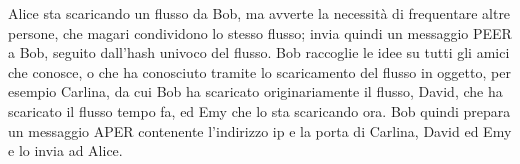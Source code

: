 Alice sta scaricando un flusso da Bob, ma avverte la necessità di frequentare
altre persone, che magari condividono lo stesso flusso; invia quindi un messaggio
PEER a Bob, seguito dall'hash univoco del flusso. Bob raccoglie le idee su tutti
gli amici che conosce, o che ha conosciuto tramite lo scaricamento del flusso in
oggetto, per esempio Carlina, da cui Bob ha scaricato originariamente il flusso,
David, che ha scaricato il flusso tempo fa, ed Emy che lo sta scaricando ora. Bob
quindi prepara un messaggio APER contenente l'indirizzo ip e la porta di Carlina,
David ed Emy e lo invia ad Alice.









